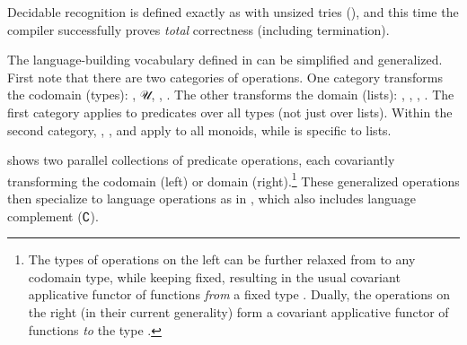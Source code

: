 \documentclass[acmsmall,screen]{acmart}
\begin{document}
Decidable recognition is defined exactly as with unsized tries (), and this time the compiler successfully proves \emph{total} correctness (including termination).


\rnc{}

The language-building vocabulary defined in  can be simplified and generalized.
First note that there are two categories of operations.
One category transforms the codomain (types): , \AF 𝒰, , .
The other transforms the domain (lists): , , , .
The first category applies to predicates over all types (not just over lists).
Within the second category, , , and  apply to all monoids, while  is specific to lists.

 shows two parallel collections of predicate operations, each covariantly transforming the codomain (left) or domain (right).\footnote{The types of operations on the left can be further relaxed from  to any codomain type, while keeping  fixed, resulting in the usual covariant applicative functor of functions \emph{from} a fixed type \citep{McBride2008APE}.
Dually, the operations on the right (in their current generality) form a covariant applicative functor of functions \emph{to} the type .}
These generalized operations then specialize to language operations as in , which also includes language complement (\AF ∁).
\end{document}
